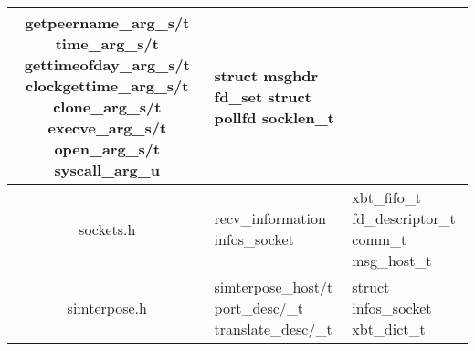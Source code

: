 \documentclass{article}
\begin{document}
\begin{tabularx}{15cm}{|c|X|X|}
{    getpeername\_arg\_s/t \newline time\_arg\_s/t \newline
    gettimeofday\_arg\_s/t \newline clockgettime\_arg\_s/t \newline
    clone\_arg\_s/t \newline execve\_arg\_s/t \newline
    open\_arg\_s/t \newline syscall\_arg\_u} & {\color{brown} struct
    msghdr \newline fd\_set \newline struct pollfd \newline
    socklen\_t}\\ \hline sockets.h & {\color{purple}
    recv\_information \newline infos\_socket} & {\color{brown}
    xbt\_fifo\_t \newline fd\_descriptor\_t \newline comm\_t
    msg\_host\_t } \\ \hline simterpose.h & {\color{purple}
    simterpose\_host/t \newline port\_desc/\_t \newline
    translate\_desc/\_t} & {\color{brown} struct
    infos\_socket \newline xbt\_dict\_t} \\ \hline
\end{tabularx}


\vspace{0.5cm} 
\end{document}
